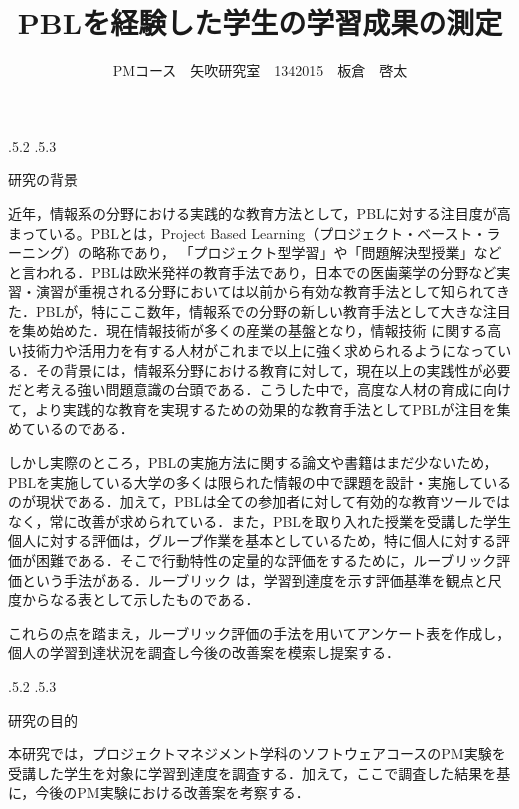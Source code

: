 \documentclass[uplatex]{jsarticle}
\title{\vspace{-14mm}PBLを経験した学生の学習成果の測定}
\author{PMコース　矢吹研究室　1342015　板倉　啓太}
\date{}%
\makeatletter
\renewcommand{\section}{%
    \if@slide\clearpage\fi
    \@startsection{section}{1}{\z@}%
    {\Cvs \@plus.5\Cdp \@minus.2\Cdp}%
    {.5\Cvs \@plus.3\Cdp}%
    {\normalfont\raggedright}}
\makeatother
\begin{document}
\maketitle





\section{研究の背景}

近年，情報系の分野における実践的な教育方法として，\cite{PBL}\cite{PBL1}PBLに対する注目度が高まっている。PBLとは，Project Based Learning（プロジェクト・ベースト・ラーニング）の略称であり，
「プロジェクト型学習」や「問題解決型授業」などと言われる．PBLは欧米発祥の教育手法であり，日本での医歯薬学の分野など実習・演習が重視される分野においては以前から有効な教育手法として知られてきた．PBLが，特にここ数年，情報系での分野の新しい教育手法として大きな注目を集め始めた．現在情報技術が多くの産業の基盤となり，情報技術 に関する高い技術力や活用力を有する人材がこれまで以上に強く求められるようになっている．その背景には，情報系分野における教育に対して，現在以上の実践性が必要だと考える強い問題意識の台頭である．こうした中で，高度な人材の育成に向けて，より実践的な教育を実現するための効果的な教育手法としてPBLが注目を集めているのである．

しかし実際のところ，PBLの実施方法に関する論文や書籍はまだ少ないため，PBLを実施している大学の多くは限られた情報の中で課題を設計・実施しているのが現状である．加えて，PBLは全ての参加者に対して有効的な教育ツールではなく，常に改善が求められている．また，PBLを取り入れた授業を受講した学生個人に対する評価は，グループ作業を基本としているため，特に個人に対する評価が困難である．そこで行動特性の定量的な評価をするために，\cite{ルーブリック評価}ルーブリック評価という手法がある．ルーブリック は，学習到達度を示す評価基準を観点と尺度からなる表として示したものである．

これらの点を踏まえ，ルーブリック評価の手法を用いてアンケート表を作成し，個人の学習到達状況を調査し今後の改善案を模索し提案する．




\section{研究の目的}

本研究では，プロジェクトマネジメント学科のソフトウェアコースのPM実験を受講した学生を対象に学習到達度を調査する．加えて，ここで調査した結果を基に，今後のPM実験における改善案を考察する．
\end{document}
